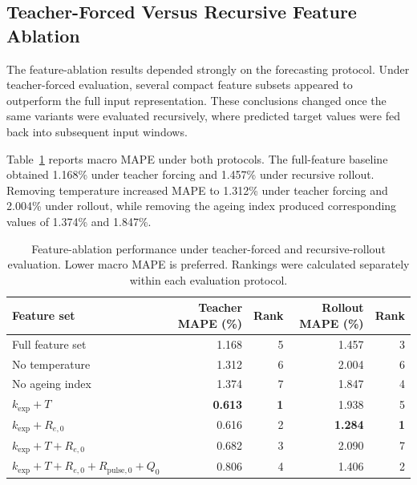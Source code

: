 \documentclass[a4paper,fleqn]{cas-sc}
\begin{document}

\subsection{Teacher-Forced Versus Recursive Feature Ablation}
\label{sec:feature_ablation_results}

The feature-ablation results depended strongly on the forecasting protocol. Under teacher-forced evaluation, several compact feature subsets appeared to outperform the full input representation. These conclusions changed once the same variants were evaluated recursively, where predicted target values were fed back into subsequent input windows.

Table~\ref{tab:feature_ablation_results} reports macro MAPE under both protocols. The full-feature baseline obtained 1.168\% under teacher forcing and 1.457\% under recursive rollout. Removing temperature increased MAPE to 1.312\% under teacher forcing and 2.004\% under rollout, while removing the ageing index produced corresponding values of 1.374\% and 1.847\%.

\begin{table}[htbp]
\centering
\caption{Feature-ablation performance under teacher-forced and recursive-rollout evaluation. Lower macro MAPE is preferred. Rankings were calculated separately within each evaluation protocol.}
\label{tab:feature_ablation_results}
\small
\begin{tabular}{lrrrr}
\toprule
\textbf{Feature set} &
\textbf{Teacher MAPE (\%)} &
\textbf{Rank} &
\textbf{Rollout MAPE (\%)} &
\textbf{Rank} \\
\midrule
Full feature set
& 1.168 & 5 & 1.457 & 3 \\

No temperature
& 1.312 & 6 & 2.004 & 6 \\

No ageing index
& 1.374 & 7 & 1.847 & 4 \\

$k_{\mathrm{exp}} + T$
& \textbf{0.613} & \textbf{1} & 1.938 & 5 \\

$k_{\mathrm{exp}} + R_{e,0}$
& 0.616 & 2 & \textbf{1.284} & \textbf{1} \\

$k_{\mathrm{exp}} + T + R_{e,0}$
& 0.682 & 3 & 2.090 & 7 \\

$k_{\mathrm{exp}} + T + R_{e,0}
 + R_{\mathrm{pulse},0} + Q_0$
& 0.806 & 4 & 1.406 & 2 \\
\bottomrule
\end{tabular}
\end{table}
\end{document}
